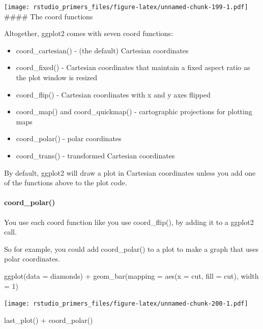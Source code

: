\documentclass[
]{article}
\newenvironment{Shaded}{\begin{snugshade}}{\end{snugshade}}
\newcommand{\AttributeTok}[1]{\textcolor[rgb]{0.77,0.63,0.00}{#1}}
\newcommand{\DecValTok}[1]{\textcolor[rgb]{0.00,0.00,0.81}{#1}}
\newcommand{\FunctionTok}[1]{\textcolor[rgb]{0.00,0.00,0.00}{#1}}
\newcommand{\NormalTok}[1]{#1}
\newcommand{\SpecialCharTok}[1]{\textcolor[rgb]{0.00,0.00,0.00}{#1}}
\providecommand{\tightlist}{%
  \setlength{\itemsep}{0pt}\setlength{\parskip}{0pt}}
\begin{document}
\texttt{[image: rstudio\_primers\_files/figure-latex/unnamed-chunk-199-1.pdf]}
\#\#\#\# The coord functions

Altogether, ggplot2 comes with seven coord functions:

\begin{itemize}
\tightlist
\item
  coord\_cartesian() - (the default) Cartesian coordinates
\item
  coord\_fixed() - Cartesian coordinates that maintain a fixed aspect
  ratio as the plot window is resized
\item
  coord\_flip() - Cartesian coordinates with x and y axes flipped
\item
  coord\_map() and coord\_quickmap() - cartographic projections for
  plotting maps
\item
  coord\_polar() - polar coordinates
\item
  coord\_trans() - transformed Cartesian coordinates
\end{itemize}

By default, ggplot2 will draw a plot in Cartesian coordinates unless you
add one of the functions above to the plot code.

\hypertarget{coord_polar}{%
\paragraph{coord\_polar()}\label{coord_polar}}

You use each coord function like you use coord\_flip(), by adding it to
a ggplot2 call.

So for example, you could add coord\_polar() to a plot to make a graph
that uses polar coordinates.

\begin{Shaded}
\begin{Highlighting}[]
\FunctionTok{ggplot}\NormalTok{(}\AttributeTok{data =}\NormalTok{ diamonds) }\SpecialCharTok{+}
  \FunctionTok{geom\_bar}\NormalTok{(}\AttributeTok{mapping =} \FunctionTok{aes}\NormalTok{(}\AttributeTok{x =}\NormalTok{ cut, }\AttributeTok{fill =}\NormalTok{ cut), }\AttributeTok{width =} \DecValTok{1}\NormalTok{) }
\end{Highlighting}
\end{Shaded}

\texttt{[image: rstudio\_primers\_files/figure-latex/unnamed-chunk-200-1.pdf]}

\begin{Shaded}
\begin{Highlighting}[]
\FunctionTok{last\_plot}\NormalTok{() }\SpecialCharTok{+}
  \FunctionTok{coord\_polar}\NormalTok{()}
\end{Highlighting}
\end{Shaded}
\end{document}
